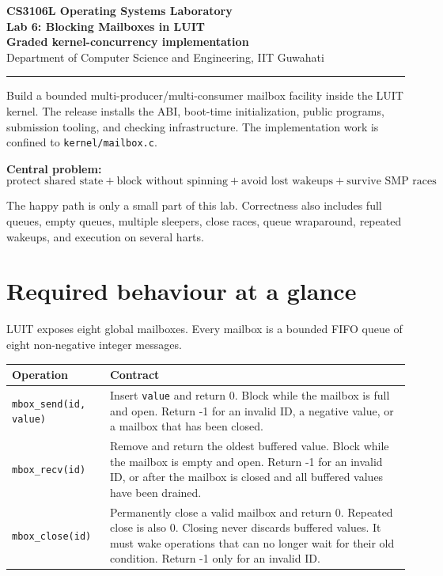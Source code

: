 \documentclass[11pt,a4paper]{article}
\newcommand{\file}[1]{\texttt{#1}}
\begin{document}
\begin{center}
{\Large\bfseries CS3106L Operating Systems Laboratory}\\[2mm]
{\LARGE\bfseries Lab 6: Blocking Mailboxes in LUIT}\\[2mm]
{\large\bfseries Graded kernel-concurrency implementation}\\[2mm]
Department of Computer Science and Engineering, IIT Guwahati
\end{center}

\hrule
\vspace{4mm}

Build a bounded multi-producer/multi-consumer mailbox facility inside the LUIT kernel. The release installs the ABI, boot-time initialization, public programs, submission tooling, and checking infrastructure. The implementation work is confined to \file{kernel/mailbox.c}.

\textbf{Central problem:}
\[
\boxed{\text{protect shared state} + \text{block without spinning} +
\text{avoid lost wakeups} + \text{survive SMP races}}
\]

The happy path is only a small part of this lab. Correctness also includes full queues, empty queues, multiple sleepers, close races, queue wraparound, repeated wakeups, and execution on several harts.

\section{Required behaviour at a glance}

LUIT exposes eight global mailboxes. Every mailbox is a bounded FIFO queue of eight non-negative integer messages.

\begin{center}
\begin{tabularx}{0.96\textwidth}{@{}p{44mm}X@{}}
\toprule
\textbf{Operation} & \textbf{Contract} \\
\midrule
\file{mbox\_send(id, value)} & Insert \file{value} and return 0. Block while the mailbox is full and open. Return -1 for an invalid ID, a negative value, or a mailbox that has been closed. \\
\file{mbox\_recv(id)} & Remove and return the oldest buffered value. Block while the mailbox is empty and open. Return -1 for an invalid ID, or after the mailbox is closed and all buffered values have been drained. \\
\file{mbox\_close(id)} & Permanently close a valid mailbox and return 0. Repeated close is also 0. Closing never discards buffered values. It must wake operations that can no longer wait for their old condition. Return -1 only for an invalid ID. \\
\bottomrule
\end{tabularx}
\end{center}
\end{document}
